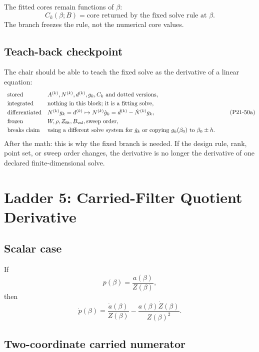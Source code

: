 \documentclass[11pt]{article}
\begin{document}
The fitted cores remain functions of \(\beta\):
\[
    C_k(\beta;B)
    =
    \text{core returned by the fixed solve rule at }\beta.
    \tag{P21-50}
\]
The branch freezes the rule, not the numerical core values.

\subsection*{Teach-back checkpoint}

The chair should be able to teach the fixed solve as the derivative of a
linear equation:
\[
\begin{array}{ll}
\text{stored} & A^{(k)},N^{(k)},d^{(k)},g_k,C_k
    \text{ and dotted versions},\\[1mm]
\text{integrated} & \text{nothing in this block; it is a fitting solve},\\[1mm]
\text{differentiated} &
    N^{(k)}g_k=d^{(k)}
    \mapsto
    N^{(k)}\dot g_k=\dot d^{(k)}-\dot N^{(k)}g_k,\\[1mm]
\text{frozen} & W,\rho,Z_{\rm fit},B_{\rm val},\text{sweep order},\\[1mm]
\text{breaks claim} &
    \text{using a different solve system for } \dot g_k
    \text{ or copying } g_k(\beta_0)
    \text{ to } \beta_0\pm h.
\end{array}
\tag{P21-50a}
\]
After the math: this is why the fixed branch is needed.  If the design rule,
rank, point set, or sweep order changes, the derivative is no longer the
derivative of one declared finite-dimensional solve.

\section{Ladder 5: Carried-Filter Quotient Derivative}

\subsection*{Scalar case}

If
\[
    p(\beta)=\frac{a(\beta)}{Z(\beta)},
    \tag{P21-51}
\]
then
\[
    \dot p(\beta)=
    \frac{\dot a(\beta)}{Z(\beta)}
    -
    \frac{a(\beta)\dot Z(\beta)}{Z(\beta)^2}.
    \tag{P21-52}
\]

\subsection*{Two-coordinate carried numerator}
\end{document}

